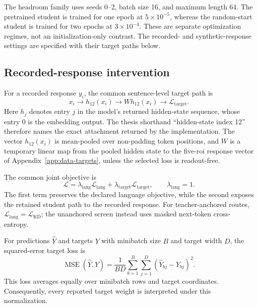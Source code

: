 The headroom family uses seeds 0--2, batch size 16, and maximum length 64.
The pretrained student is trained for one epoch at \(5\times10^{-5}\), whereas the random-start student is trained for two epochs at \(3\times10^{-4}\).
These are separate optimization regimes, not an initialization-only contrast. 
The recorded- and synthetic-response settings are specified with their target paths below.

\subsection{Recorded-response intervention}

For a recorded response \(y_i\), the common sentence-level target path is
\[
  x_i
  \longrightarrow h_{12}(x_i)
  \longrightarrow W h_{12}(x_i)
  \longrightarrow \mathcal L_{\mathrm{target}}.
\]
Here \(h_j\) denotes entry \(j\) in the model's returned hidden-state sequence, whose entry 0 is the embedding output.
The thesis shorthand ``hidden-state index 12'' therefore names the exact attachment returned by the implementation.
The vector \(h_{12}(x_i)\) is mean-pooled over non-padding token positions, and \(W\) is a temporary linear map from the pooled hidden state to the five-\ac{roi} response vector of Appendix~\ref{app:data-targets}, unless the selected loss is readout-free.

\begin{samepage}
The common joint objective is
\begin{equation}
  \mathcal L
  =
  \lambda_{\mathrm{lang}}\mathcal L_{\mathrm{lang}}
  +
  \lambda_{\mathrm{target}}\mathcal L_{\mathrm{target}},
  \qquad
  \lambda_{\mathrm{lang}}=1.
  \label{eq:recorded-objective}
\end{equation}
The first term preserves the declared language objective, while the second exposes the retained student path to the recorded response.
For teacher-anchored routes, \(\mathcal L_{\mathrm{lang}}=\mathcal L_{\mathrm{KD}}\); the unanchored screen instead uses masked next-token cross-entropy.
\end{samepage}

For predictions \(\widehat Y\) and targets \(Y\) with minibatch size \(B\) and target width \(D\), the squared-error target loss is
\[
  \operatorname{MSE}(\widehat Y,Y)
  =
  \frac{1}{BD}
  \sum_{b=1}^{B}
  \sum_{j=1}^{D}
  \left(\widehat Y_{bj}-Y_{bj}\right)^2.
\]
This loss averages equally over minibatch rows and target coordinates.
Consequently, every reported target weight is interpreted under this normalization.

